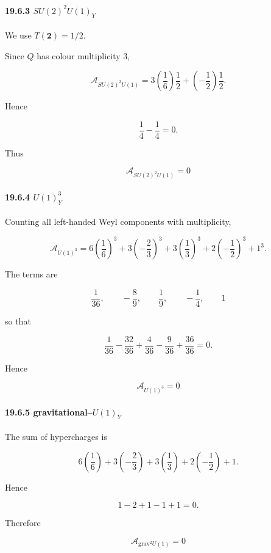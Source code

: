 \documentclass[
  a4paper,
]{article}
\begin{document}
\paragraph{\texorpdfstring{19.6.3
\(SU(2)^2U(1)_Y\)}{19.6.3 SU(2)\^{}2U(1)\_Y}}\label{su22u1_y}

We use \(T(\mathbf2)=1/2\).

Since \(Q\) has colour multiplicity 3,

\[
\mathcal A_{SU(2)^2U(1)}
=
3\left(\frac16\right)\frac12
+
\left(-\frac12\right)\frac12.
\]

Hence

\[
\frac14-\frac14=0.
\]

Thus

\[
\boxed{
\mathcal A_{SU(2)^2U(1)}=0
}
\tag{127}
\]

\paragraph{\texorpdfstring{19.6.4
\(U(1)_Y^3\)}{19.6.4 U(1)\_Y\^{}3}}\label{u1_y3}

Counting all left-handed Weyl components with multiplicity,

\[
\mathcal A_{U(1)^3}
=
6\left(\frac16\right)^3
+
3\left(-\frac23\right)^3
+
3\left(\frac13\right)^3
+
2\left(-\frac12\right)^3
+
1^3.
\tag{128}
\]

The terms are

\[
\frac1{36},
\qquad
-\frac89,
\qquad
\frac19,
\qquad
-\frac14,
\qquad
1
\]

so that

\[
\frac1{36}
-\frac{32}{36}
+\frac4{36}
-\frac9{36}
+\frac{36}{36}
=
0.
\]

Hence

\[
\boxed{
\mathcal A_{U(1)^3}=0
}
\tag{129}
\]

\paragraph{\texorpdfstring{19.6.5
gravitational--\(U(1)_Y\)}{19.6.5 gravitational--U(1)\_Y}}\label{gravitationalu1_y}

The sum of hypercharges is

\[
6\left(\frac16\right)
+
3\left(-\frac23\right)
+
3\left(\frac13\right)
+
2\left(-\frac12\right)
+
1.
\]

Hence

\[
1-2+1-1+1=0.
\]

Therefore

\[
\boxed{
\mathcal A_{\mathrm{grav}^2U(1)}=0
}
\tag{130}
\]
\end{document}
